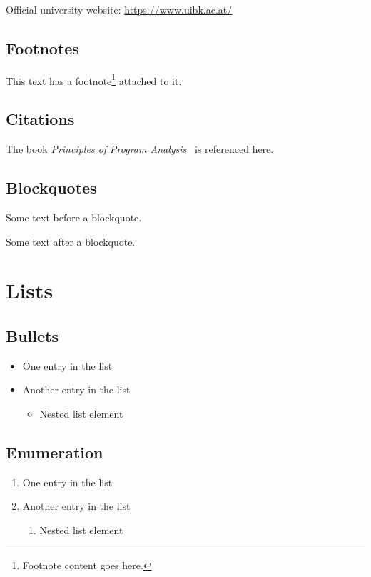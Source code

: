 \documentclass[parskip=half]{scrbook}
\begin{document}
Official university website: \url{https://www.uibk.ac.at/}

\subsection{Footnotes}

This text has a footnote\footnote{Footnote content goes here.} attached to it.

\subsection{Citations}

The book \emph{Principles of Program Analysis}~\cite{Nielson:ppa} is referenced here.

\subsection{Blockquotes}

Some text before a blockquote.

\begin{quote}
	\lipsum[3]
\end{quote}

Some text after a blockquote.

\section{Lists}

\subsection{Bullets}

\begin{itemize}
	\item One entry in the list
	\item Another entry in the list
	      \begin{itemize}
		      \item Nested list element
	      \end{itemize}
\end{itemize}

\subsection{Enumeration}

\begin{enumerate}
	\item One entry in the list
	\item Another entry in the list
	      \begin{enumerate}
		      \item Nested list element
	      \end{enumerate}
\end{enumerate}
\end{document}
